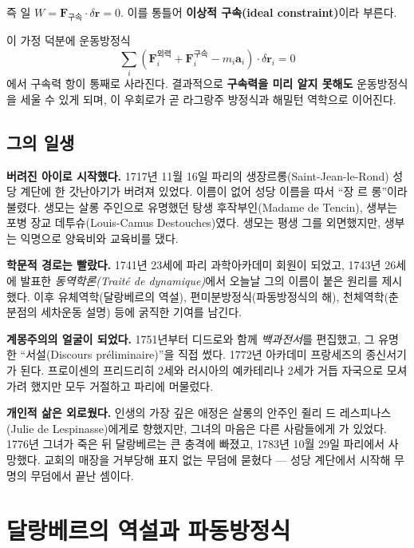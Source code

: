 \documentclass[11pt,a4paper]{article}
\begin{document}
즉 일 $W = \mathbf{F}_{\text{구속}} \cdot \delta \mathbf{r} = 0$. 이를 통틀어 \textbf{이상적 구속(ideal constraint)}이라 부른다.

이 가정 덕분에 운동방정식
\[
\sum_i (\mathbf{F}_i^{\text{외력}} + \mathbf{F}_i^{\text{구속}} - m_i \mathbf{a}_i) \cdot \delta \mathbf{r}_i = 0
\]
에서 구속력 항이 통째로 사라진다. 결과적으로 \textbf{구속력을 미리 알지 못해도} 운동방정식을 세울 수 있게 되며, 이 우회로가 곧 라그랑주 방정식과 해밀턴 역학으로 이어진다.

\subsection{그의 일생}

\textbf{버려진 아이로 시작했다.} 1717년 11월 16일 파리의 생장르롱(Saint-Jean-le-Rond) 성당 계단에 한 갓난아기가 버려져 있었다. 이름이 없어 성당 이름을 따서 ``장 르 롱''이라 불렸다. 생모는 살롱 주인으로 유명했던 탕생 후작부인(Madame de Tencin), 생부는 포병 장교 데투슈(Louis-Camus Destouches)였다. 생모는 평생 그를 외면했지만, 생부는 익명으로 양육비와 교육비를 댔다.

\textbf{학문적 경로는 빨랐다.} 1741년 23세에 파리 과학아카데미 회원이 되었고, 1743년 26세에 발표한 \emph{동역학론(Traité de dynamique)}에서 오늘날 그의 이름이 붙은 원리를 제시했다. 이후 유체역학(달랑베르의 역설), 편미분방정식(파동방정식의 해), 천체역학(춘분점의 세차운동 설명) 등에 굵직한 기여를 남긴다.

\textbf{계몽주의의 얼굴이 되었다.} 1751년부터 디드로와 함께 \emph{백과전서}를 편집했고, 그 유명한 ``서설(Discours préliminaire)''을 직접 썼다. 1772년 아카데미 프랑세즈의 종신서기가 된다. 프로이센의 프리드리히 2세와 러시아의 예카테리나 2세가 거듭 자국으로 모셔가려 했지만 모두 거절하고 파리에 머물렀다.

\textbf{개인적 삶은 외로웠다.} 인생의 가장 깊은 애정은 살롱의 안주인 쥘리 드 레스피나스(Julie de Lespinasse)에게로 향했지만, 그녀의 마음은 다른 사람들에게 가 있었다. 1776년 그녀가 죽은 뒤 달랑베르는 큰 충격에 빠졌고, 1783년 10월 29일 파리에서 사망했다. 교회의 매장을 거부당해 표지 없는 무덤에 묻혔다 --- 성당 계단에서 시작해 무명의 무덤에서 끝난 셈이다.

\section{달랑베르의 역설과 파동방정식}
\end{document}
